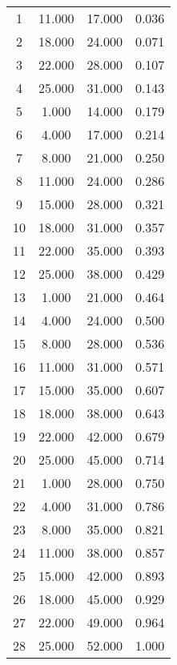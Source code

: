 % 
\begin{tabular}{cccc}
  \hline
  \hline
1 & 11.000 & 17.000 & 0.036 \\ 
  2 & 18.000 & 24.000 & 0.071 \\ 
  3 & 22.000 & 28.000 & 0.107 \\ 
  4 & 25.000 & 31.000 & 0.143 \\ 
  5 & 1.000 & 14.000 & 0.179 \\ 
  6 & 4.000 & 17.000 & 0.214 \\ 
  7 & 8.000 & 21.000 & 0.250 \\ 
  8 & 11.000 & 24.000 & 0.286 \\ 
  9 & 15.000 & 28.000 & 0.321 \\ 
  10 & 18.000 & 31.000 & 0.357 \\ 
  11 & 22.000 & 35.000 & 0.393 \\ 
  12 & 25.000 & 38.000 & 0.429 \\ 
  13 & 1.000 & 21.000 & 0.464 \\ 
  14 & 4.000 & 24.000 & 0.500 \\ 
  15 & 8.000 & 28.000 & 0.536 \\ 
  16 & 11.000 & 31.000 & 0.571 \\ 
  17 & 15.000 & 35.000 & 0.607 \\ 
  18 & 18.000 & 38.000 & 0.643 \\ 
  19 & 22.000 & 42.000 & 0.679 \\ 
  20 & 25.000 & 45.000 & 0.714 \\ 
  21 & 1.000 & 28.000 & 0.750 \\ 
  22 & 4.000 & 31.000 & 0.786 \\ 
  23 & 8.000 & 35.000 & 0.821 \\ 
  24 & 11.000 & 38.000 & 0.857 \\ 
  25 & 15.000 & 42.000 & 0.893 \\ 
  26 & 18.000 & 45.000 & 0.929 \\ 
  27 & 22.000 & 49.000 & 0.964 \\ 
  28 & 25.000 & 52.000 & 1.000 \\ 
   \hline
\end{tabular}
